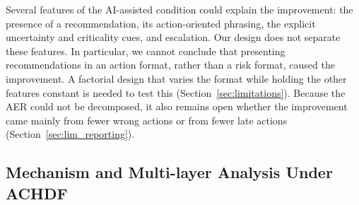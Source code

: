 \documentclass[journal]{IEEEtran}
\theoremstyle{plain}
\theoremstyle{definition}
\providecommand{\DIFaddtex}[1]{{\protect\color{blue} \sf #1}} %
\providecommand{\DIFdeltex}[1]{{\protect\color{red} \scriptsize #1}} %
\providecommand{\DIFaddbegin}{} %
\providecommand{\DIFaddend}{} %
\providecommand{\DIFdelbegin}{} %
\providecommand{\DIFdelend}{} %
\providecommand{\DIFadd}[1]{\texorpdfstring{\DIFaddtex{#1}}{#1}} %
\providecommand{\DIFdel}[1]{\texorpdfstring{\DIFdeltex{#1}}{}} %
\newcommand{\DIFscaledelfig}{0.5}
\newlength{\DIFdelgraphicswidth} %
\newlength{\DIFdelgraphicsheight} %
\newcommand{\DIFaddincludegraphics}[2][]{{\color{blue}\fbox{\DIFOincludegraphics[#1]{#2}}}} %
\newcommand{\DIFdelincludegraphics}[2][]{%
\sbox{\DIFdelgraphicsbox}{\DIFOincludegraphics[#1]{#2}}%
\settoboxwidth{\DIFdelgraphicswidth}{\DIFdelgraphicsbox} %
\settoboxtotalheight{\DIFdelgraphicsheight}{\DIFdelgraphicsbox} %
\scalebox{\DIFscaledelfig}{%
\parbox[b]{\DIFdelgraphicswidth}{\usebox{\DIFdelgraphicsbox}\\[-\baselineskip] \rule{\DIFdelgraphicswidth}{0em}}\llap{\resizebox{\DIFdelgraphicswidth}{\DIFdelgraphicsheight}{%
\setlength{\unitlength}{\DIFdelgraphicswidth}%
\begin{picture}(1,1)%
\thicklines\linethickness{2pt} %
{\color[rgb]{1,0,0}\put(0,0){\framebox(1,1){}}}%
{\color[rgb]{1,0,0}\put(0,0){\line( 1,1){1}}}%
{\color[rgb]{1,0,0}\put(0,1){\line(1,-1){1}}}%
\end{picture}%
}\hspace*{3pt}}} %
} %
\DeclareRobustCommand{\DIFaddbegin}{\DIFOaddbegin \let\includegraphics\DIFaddincludegraphics} %
\DeclareRobustCommand{\DIFaddend}{\DIFOaddend \let\includegraphics\DIFOincludegraphics} %
\DeclareRobustCommand{\DIFdelbegin}{\DIFOdelbegin \let\includegraphics\DIFdelincludegraphics} %
\DeclareRobustCommand{\DIFdelend}{\DIFOaddend \let\includegraphics\DIFOincludegraphics} %
\begin{document}
\DIFdelbegin %
\DIFdelend \DIFaddbegin \DIFadd{Several features of the AI-assisted condition could explain the improvement: the presence of a recommendation, its action-oriented phrasing, the explicit uncertainty and criticality cues, and escalation. Our design does not separate these features. In particular, we cannot conclude that presenting recommendations in an action format, rather than a risk format, caused the improvement. A factorial design that varies the format while holding the other features constant is needed to test this (Section~\ref{sec:limitations}). Because the AER could not be decomposed, it also remains open whether the improvement came mainly from fewer wrong actions or from fewer late actions (Section~\ref{sec:lim_reporting}).
}\DIFaddend 

\DIFdelbegin \subsection{\DIFdel{Mechanism and Multi-layer Analysis Under ACHDF}}
\addtocounter{subsection}{-1}%
\end{document}
